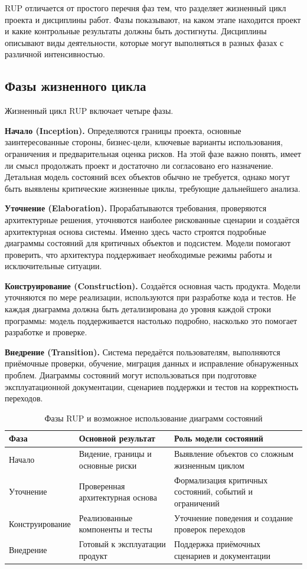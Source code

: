 \documentclass[essay,paper]{pmk-graduate}
\begin{document}
RUP отличается от простого перечня фаз тем, что разделяет жизненный цикл проекта и дисциплины работ. Фазы показывают, на каком этапе находится проект и какие контрольные результаты должны быть достигнуты. Дисциплины описывают виды деятельности, которые могут выполняться в разных фазах с различной интенсивностью.

\subsection{Фазы жизненного цикла}

Жизненный цикл RUP включает четыре фазы.

\textbf{Начало (Inception).} Определяются границы проекта, основные заинтересованные стороны, бизнес-цели, ключевые варианты использования, ограничения и предварительная оценка рисков. На этой фазе важно понять, имеет ли смысл продолжать проект и достаточно ли согласовано его назначение. Детальная модель состояний всех объектов обычно не требуется, однако могут быть выявлены критические жизненные циклы, требующие дальнейшего анализа.

\textbf{Уточнение (Elaboration).} Прорабатываются требования, проверяются архитектурные решения, уточняются наиболее рискованные сценарии и создаётся архитектурная основа системы. Именно здесь часто строятся подробные диаграммы состояний для критичных объектов и подсистем. Модели помогают проверить, что архитектура поддерживает необходимые режимы работы и исключительные ситуации.

\textbf{Конструирование (Construction).} Создаётся основная часть продукта. Модели уточняются по мере реализации, используются при разработке кода и тестов. Не каждая диаграмма должна быть детализирована до уровня каждой строки программы: модель поддерживается настолько подробно, насколько это помогает разработке и проверке.

\textbf{Внедрение (Transition).} Система передаётся пользователям, выполняются приёмочные проверки, обучение, миграция данных и исправление обнаруженных проблем. Диаграммы состояний могут использоваться при подготовке эксплуатационной документации, сценариев поддержки и тестов на корректность переходов.

\begin{table}[ht]
\centering
\caption{Фазы RUP и возможное использование диаграмм состояний}
\begin{tabularx}{\textwidth}{|p{2.8cm}|X|X|}
\hline
\textbf{Фаза} & \textbf{Основной результат} & \textbf{Роль модели состояний} \\ \hline
Начало & Видение, границы и основные риски & Выявление объектов со сложным жизненным циклом \\ \hline
Уточнение & Проверенная архитектурная основа & Формализация критичных состояний, событий и ограничений \\ \hline
Конструирование & Реализованные компоненты и тесты & Уточнение поведения и создание проверок переходов \\ \hline
Внедрение & Готовый к эксплуатации продукт & Поддержка приёмочных сценариев и документации \\ \hline
\end{tabularx}
\end{table}
\end{document}
